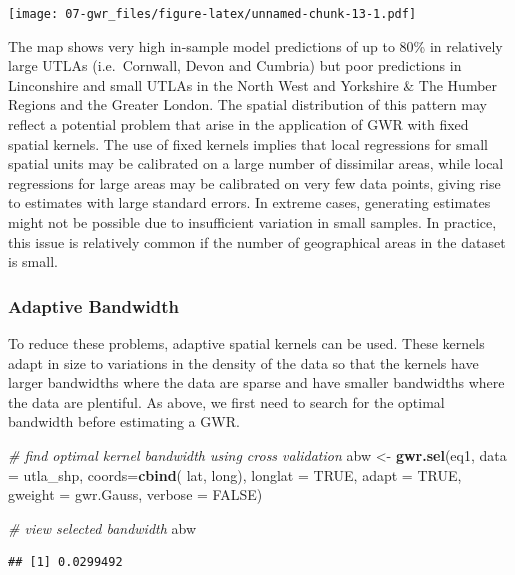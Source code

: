 \documentclass[]{book}
\newenvironment{Shaded}{\begin{snugshade}}{\end{snugshade}}
\newcommand{\KeywordTok}[1]{\textcolor[rgb]{0.13,0.29,0.53}{\textbf{#1}}}
\newcommand{\DataTypeTok}[1]{\textcolor[rgb]{0.13,0.29,0.53}{#1}}
\newcommand{\StringTok}[1]{\textcolor[rgb]{0.31,0.60,0.02}{#1}}
\newcommand{\CommentTok}[1]{\textcolor[rgb]{0.56,0.35,0.01}{\textit{#1}}}
\newcommand{\OtherTok}[1]{\textcolor[rgb]{0.56,0.35,0.01}{#1}}
\newcommand{\NormalTok}[1]{#1}
\begin{document}
\texttt{[image: 07-gwr\_files/figure-latex/unnamed-chunk-13-1.pdf]}

The map shows very high in-sample model predictions of up to 80\% in
relatively large UTLAs (i.e.~Cornwall, Devon and Cumbria) but poor
predictions in Linconshire and small UTLAs in the North West and
Yorkshire \& The Humber Regions and the Greater London. The spatial
distribution of this pattern may reflect a potential problem that arise
in the application of GWR with fixed spatial kernels. The use of fixed
kernels implies that local regressions for small spatial units may be
calibrated on a large number of dissimilar areas, while local
regressions for large areas may be calibrated on very few data points,
giving rise to estimates with large standard errors. In extreme cases,
generating estimates might not be possible due to insufficient variation
in small samples. In practice, this issue is relatively common if the
number of geographical areas in the dataset is small.

\subsubsection{Adaptive Bandwidth}\label{adaptive-bandwidth}

To reduce these problems, adaptive spatial kernels can be used. These
kernels adapt in size to variations in the density of the data so that
the kernels have larger bandwidths where the data are sparse and have
smaller bandwidths where the data are plentiful. As above, we first need
to search for the optimal bandwidth before estimating a GWR.

\begin{Shaded}
\begin{Highlighting}[]
\CommentTok{# find optimal kernel bandwidth using cross validation}
\NormalTok{abw <-}\StringTok{ }\KeywordTok{gwr.sel}\NormalTok{(eq1, }
               \DataTypeTok{data =}\NormalTok{ utla_shp, }
               \DataTypeTok{coords=}\KeywordTok{cbind}\NormalTok{( lat, long),}
               \DataTypeTok{longlat =} \OtherTok{TRUE}\NormalTok{,}
               \DataTypeTok{adapt =} \OtherTok{TRUE}\NormalTok{, }
               \DataTypeTok{gweight =}\NormalTok{ gwr.Gauss, }
               \DataTypeTok{verbose =} \OtherTok{FALSE}\NormalTok{)}

\CommentTok{# view selected bandwidth}
\NormalTok{abw}
\end{Highlighting}
\end{Shaded}

\begin{verbatim}
## [1] 0.0299492
\end{verbatim}
\end{document}
